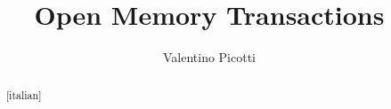 \documentclass{thesis}
\title{Open Memory Transactions}
\author{Valentino Picotti}
\begin{document}
\maketitle

\begin{dedication}

\end{dedication}

\begin{abstract}[italian]

\end{abstract}

\begin{abstract}

\end{abstract}

\begin{acknowledgements}[italian]

\end{acknowledgements}

\tableofcontents

\mainmatter






\backmatter

\printindex
\end{document}
